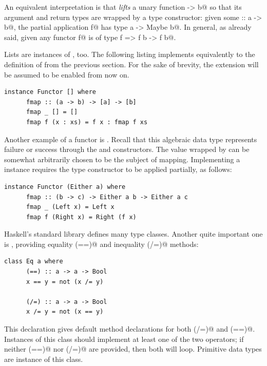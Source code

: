 \documentclass[UdineBachThesis,american,11pt]{PhdThesis}
\begin{document}
  An equivalent interpretation is that \lstinline@fmap@ \emph{lifts} a unary
  function \lstinline@a -> b@ so that its argument and return types are wrapped
  by a \lstinline@Maybe@ type constructor: given some \lstinline@f :: a -> b@,
  the partial application \lstinline@fmap f@ has type
  \lstinline@Maybe a -> Maybe b@. In general, as already said, given any functor
  \lstinline@fmap f@ is of type \lstinline@Functor f => f b -> f b@.

  Lists are instances of \lstinline@Functor@, too. The following listing
  implements \lstinline@fmap@ equivalently to the definition of \lstinline@map@
  from the previous section. For the sake of brevity, the
  \lstinline@InstanceSigs@ extension will be assumed to be enabled from now on.

  \begin{lstlisting}[gobble=4,basicstyle=\ttfamily\small]
    instance Functor [] where
      fmap :: (a -> b) -> [a] -> [b]
      fmap _ [] = []
      fmap f (x : xs) = f x : fmap f xs
  \end{lstlisting}

  Another example of a functor is \lstinline@Either@. Recall that this algebraic
  data type represents failure or success through the \lstinline@Left@ and
  \lstinline@Right@ constructors. The value wrapped by \lstinline@Right@ can be
  somewhat arbitrarily chosen to be the subject of mapping. Implementing a
  \lstinline@Functor@ instance requires the type constructor \lstinline@Either@
  to be applied partially, as follows:

  \begin{lstlisting}[gobble=4,basicstyle=\ttfamily\small]
    instance Functor (Either a) where
      fmap :: (b -> c) -> Either a b -> Either a c
      fmap _ (Left x) = Left x
      fmap f (Right x) = Right (f x)
  \end{lstlisting}

  Haskell's standard library defines many type classes. Another quite important
  one is \lstinline@Eq@, providing equality \lstinline@(==)@ and inequality
  \lstinline@(/=)@ methods:

  \begin{lstlisting}[gobble=4,basicstyle=\ttfamily\small]
    class Eq a where
      (==) :: a -> a -> Bool
      x == y = not (x /= y)

      (/=) :: a -> a -> Bool
      x /= y = not (x == y)
  \end{lstlisting}

  This declaration gives default method declarations for both \lstinline@(/=)@
  and \lstinline@(==)@. Instances of this class should implement at least one of
  the two operators; if neither \lstinline@(==)@ nor \lstinline@(/=)@ are
  provided, then both will loop. Primitive data types are instance of this
  class.
\end{document}
